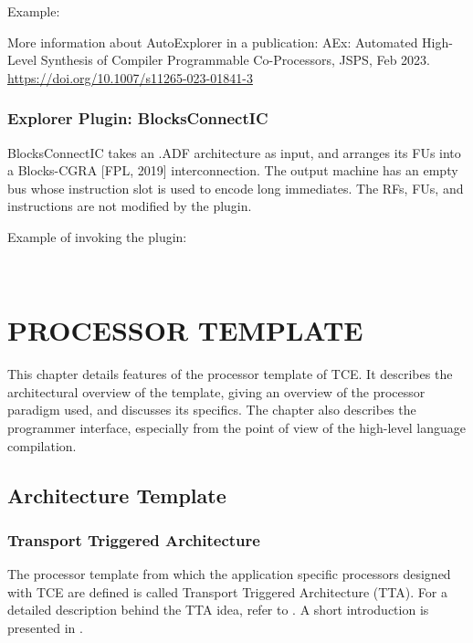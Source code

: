 \documentclass[a4paper,twoside]{tceusermanual}
\begin{document}
Example:

More information about AutoExplorer in a publication:
AEx: Automated High-Level Synthesis of Compiler Programmable Co-Processors, JSPS, Feb 2023.
\url{https://doi.org/10.1007/s11265-023-01841-3}

\subsection{Explorer Plugin: BlocksConnectIC}

BlocksConnectIC takes an .ADF architecture as input, and arranges its FUs into a
Blocks-CGRA [FPL, 2019] interconnection. The output machine has an empty bus whose
instruction slot is used to encode long immediates. The RFs, FUs, and instructions
are not modified by the plugin.

Example of invoking the plugin:

\\

\chapter{PROCESSOR TEMPLATE}
\label{section:template}

This chapter details features of the processor template of TCE.
It describes the architectural overview of the template, giving 
an overview of the processor paradigm used, and discusses
its specifics. The chapter also describes the programmer interface, 
especially from the point of view of the high-level language 
compilation.

\section{Architecture Template}

\subsection{Transport Triggered Architecture} 

The processor template from which the application specific processors
designed with TCE are defined is called Transport Triggered
Architecture (TTA). For a detailed description behind the TTA
idea, refer to \cite{HCorp97}. A short introduction is presented
in \cite{boutellier11}.
\end{document}
